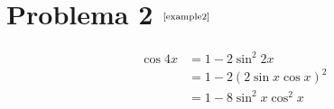 \section*{Problema 2 $^{\text{\cite{example2}}}$}

\begin{equation}
    \label{eq:2}
    \begin{aligned}
        \cos 4x & = 1 - 2\sin^2 2x          \\
                & = 1 - 2(2\sin x \cos x)^2 \\
                & = 1 - 8\sin^2 x \cos^2 x  \\
    \end{aligned}
\end{equation}